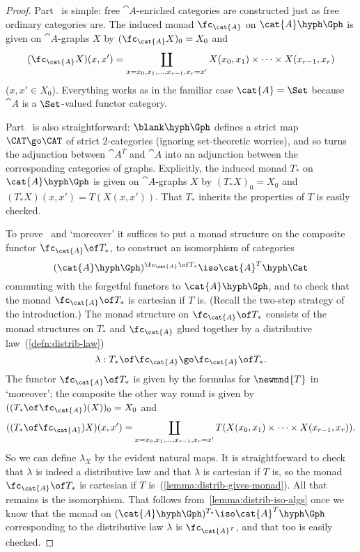 \begin{proof}
Part~ is simple: free $\cat{A}$-enriched
categories are constructed just as free ordinary categories are.
The induced monad $\fc_\cat{A}$ on $\cat{A}\hyph\Gph$ is given on
$\cat{A}$-graphs $X$ by $(\fc_\cat{A} X)_0 = X_0$ and
\[
(\fc_\cat{A}X)(x,x')
=
\coprod_{x=x_0, x_1, \ldots, x_{r-1}, x_r=x'}
X(x_0, x_1) \times\cdots\times X(x_{r-1},x_r)
\]
($x,x' \in X_0$).  Everything works as in the familiar case $\cat{A}=\Set$
because $\cat{A}$ is a $\Set$-valued functor category.

Part~ is also straightforward: $\blank\hyph\Gph$
defines a strict map $\CAT \go \CAT$ of strict 2-categories (ignoring
set-theoretic worries), and so turns the adjunction between $\cat{A}^T$ and
$\cat{A}$ into an adjunction between the corresponding categories of
graphs.  Explicitly, the induced monad $T_*$ on $\cat{A}\hyph\Gph$ is given
on $\cat{A}$-graphs $X$ by $(T_* X)_0 = X_0$ and $(T_* X)(x,x') =
T(X(x,x'))$.  That $T_*$ inherits the properties of $T$ is easily checked.

To prove~ and `moreover' it suffices to put a
monad structure on the composite functor $\fc_\cat{A} \of T_*$, to
construct an isomorphism of categories
\[
(\cat{A}\hyph\Gph)^{\fc_\cat{A} \of T_*} \iso \cat{A}^T\hyph\Cat
\]
commuting with the forgetful functors to $\cat{A}\hyph\Gph$, and to check
that the monad $\fc_\cat{A} \of T_*$ is cartesian if $T$ is.  (Recall the
two-step strategy of the introduction.)  The monad structure on
$\fc_\cat{A} \of T_*$ consists of the monad structures on $T_*$ and
$\fc_\cat{A}$ glued together by a distributive%
%
%
law~(\ref{defn:distrib-law})
\[
\lambda: T_* \of \fc_\cat{A} \go \fc_\cat{A} \of T_*.
\]
The functor $\fc_\cat{A} \of T_*$ is given by the formulas for $\newmnd{T}$
in `moreover'; the composite the other way round is given by $((T_* \of
\fc_\cat{A})(X))_0 = X_0$ and
\[
((T_* \of \fc_\cat{A})X)(x,x') 
=
\coprod_{x=x_0, x_1, \ldots, x_{r-1}, x_r=x'}
T(X(x_0, x_1) \times\cdots\times X(x_{r-1},x_r)).
\]
So we can define $\lambda_X$ by the evident natural maps.  It is
straightforward to check that $\lambda$ is indeed a distributive law and
that $\lambda$ is cartesian if $T$ is, so the monad $\fc_\cat{A} \of T_*$
is cartesian if $T$ is~(\ref{lemma:distrib-gives-monad}).  All that remains
is the isomorphism.  That follows from~\ref{lemma:distrib-iso-algs} once we
know that the monad on $(\cat{A}\hyph\Gph)^{T_*} \iso \cat{A}^T\hyph\Gph$
corresponding to the distributive law $\lambda$ is $\fc_{\cat{A}^T}$, and
that too is easily checked.  \done
\end{proof}%
%
%
%
%





